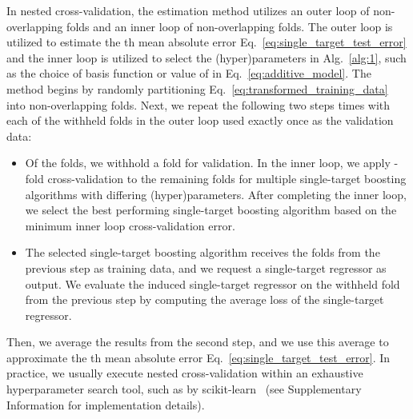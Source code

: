 \documentclass[aps,twocolumn,superscriptaddress,floatfix,preprintnumbers,showkeys]{revtex4}
\begin{document}
In nested cross-validation, the estimation method utilizes an outer loop of  non-overlapping folds and an inner loop of  non-overlapping folds. The outer loop is utilized to estimate the th mean absolute error Eq.~\ref{eq:single_target_test_error} and the inner loop is utilized to select the (hyper)parameters in Alg.\ \ref{alg:1}, such as the choice of basis function or value of  in Eq.~\ref{eq:additive_model}. The method begins by randomly partitioning Eq.~\ref{eq:transformed_training_data} into  non-overlapping folds. Next, we repeat the following two steps  times with each of the withheld folds in the outer loop used exactly once as the validation data:\
\begin{itemize}
\item Of the  folds, we withhold a fold for validation. In the inner loop, we apply -fold cross-validation to the remaining  folds for multiple single-target boosting algorithms with differing (hyper)parameters. After completing the inner loop, we select the best performing single-target boosting algorithm based on the minimum inner loop cross-validation error.
\item The selected single-target boosting algorithm receives the  folds from the previous step as training data, and we request a single-target regressor as output. We evaluate the induced single-target regressor on the withheld fold from the previous step by computing the average loss of the single-target regressor.
\end{itemize}
Then, we average the  results from the second step, and we use this average to approximate the th mean absolute error Eq.~\ref{eq:single_target_test_error}. In practice, we usually execute nested cross-validation within an exhaustive hyperparameter search tool, such as  by scikit-learn~\cite{Sklearn_2011} (see Supplementary Information for implementation details).  
\end{document}
